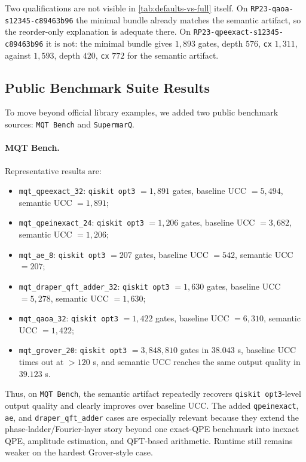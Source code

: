 Two qualifications are not visible in \cref{tab:defaults-vs-full} itself.
On \texttt{RP23-qaoa-s12345-c89463b96} the minimal bundle already matches
the semantic artifact, so the reorder-only explanation is adequate there.
On \texttt{RP23-qpeexact-s12345-c89463b96} it is not: the minimal bundle
gives $1{,}893$ gates, depth $576$, \texttt{cx} $1{,}311$, against
$1{,}593$, depth $420$, \texttt{cx} $772$ for the semantic artifact.


\subsection{Public Benchmark Suite Results}

To move beyond official library examples, we added two public benchmark sources: \texttt{MQT Bench} and \texttt{SupermarQ}.

\paragraph{MQT Bench.}
Representative results are:
\begin{itemize}[leftmargin=1.5em]
    \item \texttt{mqt\_qpeexact\_32}: \texttt{qiskit opt3} $= 1{,}891$ gates, baseline UCC $= 5{,}494$, semantic UCC $= 1{,}891$;
    \item \texttt{mqt\_qpeinexact\_24}: \texttt{qiskit opt3} $= 1{,}206$ gates, baseline UCC $= 3{,}682$, semantic UCC $= 1{,}206$;
    \item \texttt{mqt\_ae\_8}: \texttt{qiskit opt3} $= 207$ gates, baseline UCC $= 542$, semantic UCC $= 207$;
    \item \texttt{mqt\_draper\_qft\_adder\_32}: \texttt{qiskit opt3} $= 1{,}630$ gates, baseline UCC $= 5{,}278$, semantic UCC $= 1{,}630$;
    \item \texttt{mqt\_qaoa\_32}: \texttt{qiskit opt3} $= 1{,}422$ gates, baseline UCC $= 6{,}310$, semantic UCC $= 1{,}422$;
    \item \texttt{mqt\_grover\_20}: \texttt{qiskit opt3} $= 3{,}848{,}810$ gates in $38.043$ s, baseline UCC times out at $>120$ s, and semantic UCC reaches the same output quality in $39.123$ s.
\end{itemize}
Thus, on \texttt{MQT Bench}, the semantic artifact repeatedly recovers
\texttt{qiskit opt3}-level output quality and clearly improves over baseline
UCC.  The added \texttt{qpeinexact}, \texttt{ae}, and
\texttt{draper\_qft\_adder} cases are especially relevant because they extend
the phase-ladder/Fourier-layer story beyond one exact-QPE benchmark into
inexact QPE, amplitude estimation, and QFT-based arithmetic. Runtime still
remains weaker on the hardest Grover-style case.

